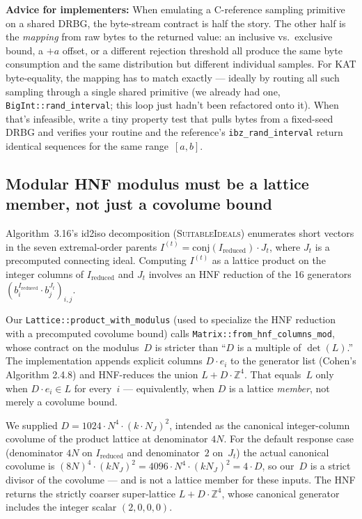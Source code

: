 \noindent
\textbf{Advice for implementers:} When emulating a C-reference
sampling primitive on a shared DRBG, the byte-stream contract is
half the story.  The other half is the \emph{mapping} from raw
bytes to the returned value: an inclusive vs.\ exclusive bound,
a $+a$ offset, or a different rejection threshold all produce
the same byte consumption and the same distribution but
different individual samples.  For KAT byte-equality, the
mapping has to match exactly --- ideally by routing all such
sampling through a single shared primitive (we already had one,
\texttt{BigInt::rand\_interval}; this loop just hadn't been
refactored onto it).  When that's infeasible, write a tiny
property test that pulls bytes from a fixed-seed DRBG and
verifies your routine and the reference's
\texttt{ibz\_rand\_interval} return identical sequences for
the same range~$[a, b]$.

\subsection{Modular HNF modulus must be a lattice member, not just a
  covolume bound}
\label{sec:bug-hnf-mod-modulus}

Algorithm~3.16's id2iso decomposition (\textsc{SuitableIdeals})
enumerates short vectors in the seven extremal-order parents
$I^{(t)} = \mathrm{conj}(I_{\mathrm{reduced}}) \cdot J_t$,
where $J_t$ is a precomputed connecting ideal.  Computing
$I^{(t)}$ as a lattice product on the integer columns of
$I_{\mathrm{reduced}}$ and $J_t$ involves an HNF
reduction of the 16 generators
$(b_i^{I_{\mathrm{reduced}}} \cdot b_j^{J_t})_{i,j}$.

Our \texttt{Lattice::product\_with\_modulus} (used to specialize
the HNF reduction with a precomputed covolume bound) calls
\texttt{Matrix::from\_hnf\_columns\_mod}, whose contract on the
modulus~$D$ is stricter than ``$D$ is a multiple of
$\det(L)$.''  The implementation appends explicit columns
$D \cdot e_i$ to the generator list (Cohen's Algorithm
2.4.8) and HNF-reduces the union $L + D\cdot\mathbb{Z}^4$.
That equals~$L$ only when $D \cdot e_i \in L$ for every~$i$
--- equivalently, when $D$ is a lattice \emph{member}, not
merely a covolume bound.

We supplied $D = 1024 \cdot N^4 \cdot (k \cdot N_J)^2$,
intended as the canonical integer-column covolume of the
product lattice at denominator $4N$.  For the default response
case (denominator $4N$ on $I_{\mathrm{reduced}}$ and
denominator~$2$ on~$J_t$) the actual canonical covolume is
$(8N)^4 \cdot (kN_J)^2 = 4096 \cdot N^4 \cdot (kN_J)^2 =
4 \cdot D$, so our~$D$ is a strict divisor of the covolume
--- and is not a lattice member for these inputs.  The HNF
returns the strictly coarser super-lattice $L + D\cdot\mathbb{Z}^4$,
whose canonical generator includes the integer scalar
$(2, 0, 0, 0)$.

